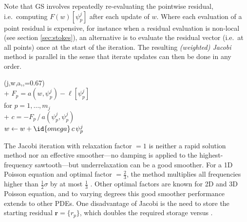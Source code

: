 \documentclass[letterpaper,final,12pt,reqno]{amsart}
\theoremstyle{claim}
\newcommand{\br}{\mathbf{r}}
\numberwithin{equation}{section}
\numberwithin{figure}{section}
\numberwithin{table}{section}
\numberwithin{theorem}{section}
\begin{document}
Note that GS involves repeatedly re-evaluating the pointwise residual, i.e.~computing $F(w)[\psi_p^j]$ after each update of $w$.  Where each evaluation of a point residual is expensive, for instance when a residual evaluation is non-local (see section \ref{sec:stokes}), an alternative is to evaluate the residual vector (i.e.~at all points) once at the start of the iteration.  The resulting \emph{(weighted) Jacobi} method is parallel in the sense that iterate updates can then be done in any order.

\begin{pseudo*} \label{ps:jacobi-sweep}
(j,w,a,\ell,=0.67)\text{:} \\+
    $F_p = a(w,\psi_p^j) - \ell[\psi_p^j]$ \qquad\qquad\qquad\qquad {} \\
    for $p=1,\dots,m_j$ \\+
        $\displaystyle c = - F_p \, \big/ \, a(\psi_p^j,\psi_p^j)$  \\
        $w \gets w + \id{omega} \,c \,\psi_p^j$
\end{pseudo*}

The Jacobi iteration with relaxation factor  $=1$ is neither a rapid solution method nor an effective smoother---no damping is applied to the highest-frequency sawtooth---but underrelaxation can be a good smoother.  For a 1D Poisson equation and optimal factor  $=\frac{2}{3}$, the method multiplies all frequencies higher than $\frac{1}{2} \sigma$ by at most $\frac{1}{3}$ \cite[Chapter 4]{Briggsetal2000}.  Other optimal factors are known for 2D and 3D Poisson equation, and to varying degrees this good smoother performance extends to other PDEs.  One disadvantage of Jacobi is the need to store the starting residual $\br = \{r_p\}$, which doubles the required storage versus .
\end{document}
